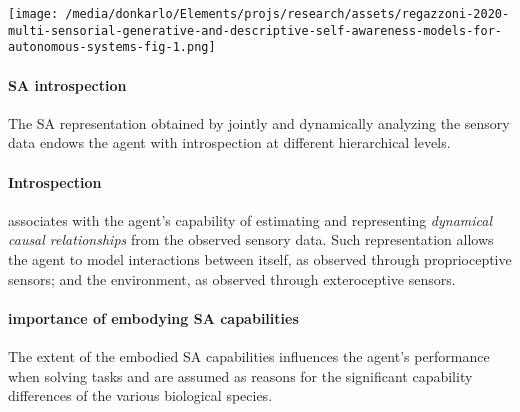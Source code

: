 \documentclass{article}
\begin{document}
		\begin{figure*}
			\centering
			\texttt{[image: /media/donkarlo/Elements/projs/research/assets/regazzoni-2020-multi-sensorial-generative-and-descriptive-self-awareness-models-for-autonomous-systems-fig-1.png]}
			\caption{\citet{regazzoni-2020-multi-sensorial-generative-and-descriptive-self-awareness-models-for-autonomous-systems}}
			\label{fig:regazzoni-2020-multi-sensorial-generative-and-descriptive-self-awareness-models-for-autonomous-systems-fig-1.jpg}
		\end{figure*}
		
		\paragraph{SA introspection}  The SA representation obtained by jointly and dynamically analyzing the sensory data endows the agent with introspection at different hierarchical levels.
		
		\paragraph{Introspection} associates with the agent’s capability of estimating and
		representing \emph{dynamical causal relationships} from the observed sensory data. Such representation allows the agent to model interactions between itself, as observed through proprioceptive
		sensors; and the environment, as observed through exteroceptive sensors.
		
		\paragraph{importance of embodying SA capabilities}The extent of the embodied SA capabilities influences the agent's performance when solving tasks and are assumed as reasons for the significant capability differences of the various biological species. 
		
\end{document}
